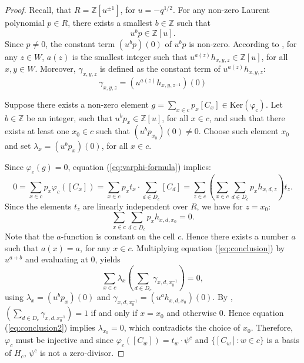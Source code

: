 \documentclass[oneside, a4paper, 11pt]{amsart}
\newcommand{\Z}{\mathbb{Z}}
\newcommand{\Ker}[1]{\mathrm{Ker}(#1)}
\newcommand{\ZZ}{\mathbb{Z}}
\begin{document}
\begin{proof}
Recall, that  $R=\Z[u^{\pm 1}]$, for  $u=-q^{1/2}$. 
For any non-zero Laurent polynomial $p\in R$, there exists a smallest $b\in \ZZ$ such that 
\begin{equation}
u^b p \in \Z[u].
\end{equation}
Since $p\neq 0$, the constant term $(u^b p)(0)$ of $u^bp$ is non-zero.
According to \cite[p.538]{Lusztig2}, for any $z\in W$,  $a(z)$ is the smallest integer such that $u^{a(z)}h_{x,y,z}\in \Z[u]$, for all $x,y\in W$. Moreover, $\gamma_{x,y,z}$ is defined  as the constant term of $u^{a(z)}h_{x,y,z}$:
\begin{equation}\label{def:gamma}\gamma_{x,y,z} = \left(u^{a(z)}h_{x,y,z^{-1}}\right)(0)
\end{equation}

Suppose there exists a non-zero element  $g = \sum_{x\in c} p_x [C_x] \in \mathrm{\Ker{\varphi_c}}$. Let $b\in \Z$ be an integer, such that  $u^bp_x \in \Z[u]$, for all $x\in c$, and such that there exists at least one $x_0\in c$ such that $(u^bp_{x_0})(0)\neq 0$. Choose such element $x_0$ and set $\lambda_x=(u^bp_x)(0)$, for all $x\in c$.

Since $\varphi_c(g)=0$, equation (\ref{eq:varphi-formula}) implies:
\begin{equation}
0=\sum_{x\in c} p_x \varphi_c([C_x]) = \sum_{x\in c} p_x t_x\cdot \sum_{d\in D_c} [C_d] 
= \sum_{z\in c} \left( \sum_{x\in c}  \sum_{d\in D_c} p_x h_{x,d,z}\right) t_z.
\end{equation}
Since the elements $t_z$ are linearly independent over $R$, we have for  $z=x_0$:
\begin{equation}\label{eq:conclusion}
 \sum_{x\in c}  \sum_{d\in D_c} p_x h_{x,d,x_0} = 0.
\end{equation}
Note that the $a$-function is constant on the cell $c$. Hence there exists a number $a$ such that $a(x)=a$, for any $x\in c$. Multiplying equation (\ref{eq:conclusion}) by $u^{a+b}$ and evaluating at $0$, yields
\begin{equation}\label{eq:conclusion2}
 \sum_{x\in c}  \lambda_x \left(\sum_{d\in D_c} \gamma_{x,d,x_0^{-1}}\right) = 0,
\end{equation}
using $\lambda_x=(u^bp_x)(0)$ and   $\gamma_{x,d,x_0^{-1}} = (u^ah_{x,d,x_0})(0)$.
By \cite[page 543]{Lusztig2}, $\left(\sum_{d\in D_c} \gamma_{x,d,x_0^{-1}}\right)=1$ if and only if $x=x_0$ and otherwise $0$. Hence equation (\ref{eq:conclusion2}) implies $\lambda_{x_0}=0$, which contradicts the choice of $x_0$. Therefore, $\varphi_c$ must be injective and since $\varphi_c([C_w]) = t_w\cdot \psi^c$ and $\{[C_w] : w\in c\}$ is a basis of $H_c$, $\psi^c$ is not a zero-divisor.
\end{proof}
\end{document}
